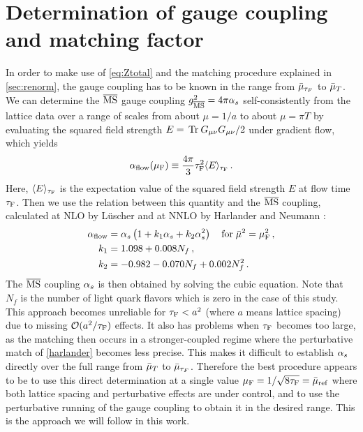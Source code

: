 \documentclass[floatfix,twocolumn,prd,showpacs,preprintnumbers,amsmath,nofootinbib,amssymb,superscriptaddress]{revtex4-2}
\begin{document}
\section{Determination of gauge coupling and matching factor}\label{sec:coupling}


In order to make use of \cref{eq:Ztotal} and the matching procedure explained in \cref{sec:renorm}, the gauge coupling has to be known in the range 
from $\bar{\mu}_{\tau_F}$ to $\bar{\mu}_{T}$. 
We can determine the $\overline{\text{MS}}$ gauge coupling $g^2_{\overline{\text{MS}}}=4\pi \alpha_s$ self-consistently from the lattice data over a range of scales from about $\mu=1/a$ to about $\mu=\pi T$ by evaluating the squared field strength $E= \,\mathrm{Tr}\: G_{\mu\nu} G_{\mu\nu}/2$ under gradient flow, which yields
\begin{equation}
\label{ggfdef}
    \alpha_\text{flow} (\mu_\mathrm{F}) \equiv \frac{4\pi}{3}  \tau_\mathrm{F}^2 \langle E \rangle_{\tau_\mathrm{F}} \,.
\end{equation}
Here, $\displaystyle \langle E \rangle_{\tau_\mathrm{F}}$ is the expectation value of the squared field strength $E$ at flow time $\tau_\mathrm{F}$.
Then we use the relation between this quantity and the $\overline{\text{MS}}$ coupling, calculated at NLO by L\"uscher \cite{Luscher:2010iy} and at NNLO by Harlander and Neumann \cite{Harlander:2016vzb}: 
\begin{align}
    \label{harlander}
    \alpha_\text{flow} & = \alpha_s
    \left( 1 + k_1 \alpha_s + k_2 \alpha_s^2 \right)
    \quad \mbox{for} \; \bar{\mu}^2  = \mu_\mathrm{F}^2 \,,
    \\
    k_1 & = 1.098 + 0.008 N_f \,, \nonumber \\
    k_2 & = -0.982 - 0.070 N_f + 0.002 N_f^2 \,. \nonumber
\end{align}
The $\overline{\text{MS}}$ coupling $\alpha_s$ is then obtained by solving the cubic equation. Note that $N_f$ is the number of light quark flavors which is zero in the case of this study.
This approach becomes unreliable for $\tau_\mathrm{F} < a^2$ (where $a$ means lattice spacing) due to missing $\mathcal{O}(a^2/\tau_\mathrm{F})$ effects.
It also has problems when $\tau_\mathrm{F}$ becomes too large, as the matching then occurs in a stronger-coupled regime where the perturbative match of \cref{harlander} becomes less precise.
This makes it difficult to establish $\alpha_s$ directly over the full range from $\bar{\mu}_{T}$ to $\bar{\mu}_{\tau_F}$.
Therefore the best procedure appears to be to use this direct determination at a single value $\mu_\mathrm{F}=1/\sqrt{8\tau_\mathrm{F}}=\bar{\mu}_\mathrm{ref}$ where both lattice spacing and perturbative effects are under control, and to use the perturbative running of the gauge coupling to obtain it in the desired range.
This is the approach we will follow in this work.
\end{document}
